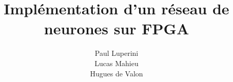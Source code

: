 \documentclass[A4]{article}
\title{Implémentation d'un réseau de neurones sur FPGA}
\author{Paul Luperini\\ Lucas Mahieu\\Hugues de Valon}
\begin{document}
\maketitle


\pagebreak
\tableofcontents

\pagebreak

\end{document}
